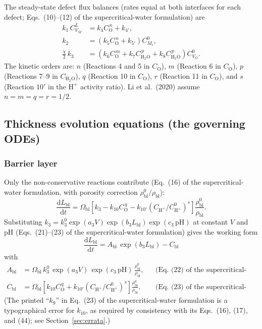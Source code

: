 The steady-state defect flux balances (rates equal at both interfaces for each
defect; Eqs.~(10)--(12) of the supercritical-water formulation) are
\begin{align}
k_1\, C_{V_M}^{L} &= k_4 C_{\mathrm{O}}^{\,n} + k_{4'} , \\
k_2 &= \left( k_5 C_{\mathrm{O}}^{\,n} + k_{5'} \right) C_{M_i}^{0} , \\
\frac{\chi}{2}\, k_3 &= \left( k_6 C_{\mathrm{O}}^{\,m}
+ k_7 C_{\mathrm{H_2O}}^{\,p} + k_8 C_{\mathrm{H_2O}}^{\,p} \right) C_{V_O}^{0} .
\end{align}
The kinetic orders are: $n$ (Reactions 4 and 5 in $C_{\mathrm{O}}$),
$m$ (Reaction 6 in $C_{\mathrm{O}}$), $p$ (Reactions 7--9 in
$C_{\mathrm{H_2O}}$), $q$ (Reaction 10 in $C_{\mathrm{O}}$),
$r$ (Reaction 11 in $C_{\mathrm{O}}$), and $s$ (Reaction $10'$ in the
$\mathrm{H^+}$ activity ratio). Li et al.\ (2020) assume $n = m = q = r = 1/2$.

\subsection{Thickness evolution equations (the governing ODEs)}
\label{sec:odes}

\subsubsection{Barrier layer}

Only the non-conservative reactions contribute
(Eq.~(16) of the supercritical-water formulation, with porosity correction
$\rho^0_{\mathrm{bl}}/\rho_{\mathrm{bl}}$):
\begin{equation}
\frac{\mathrm{d}L_{\mathrm{bl}}}{\mathrm{d}t}
= \Omega_{\mathrm{bl}} \left[ k_3 - k_{10} C_{\mathrm{O}}^{\,q}
- k_{10'} \left( C_{\mathrm{H^+}}/C^0_{\mathrm{H^+}} \right)^{s} \right]
\frac{\rho^0_{\mathrm{bl}}}{\rho_{\mathrm{bl}}} .
\end{equation}
Substituting
$k_3 = k_3^{0} \exp(a_3 V) \exp(b_3 L_{\mathrm{bl}}) \exp(c_3\,\mathrm{pH})$
at constant $V$ and pH (Eqs.~(21)--(23) of the supercritical-water
formulation) gives the working form
\begin{equation}
\boxed{\;
\frac{\mathrm{d}L_{\mathrm{bl}}}{\mathrm{d}t}
= A_{\mathrm{bl}}\, \exp( b_3 L_{\mathrm{bl}} ) - C_{\mathrm{bl}}
\;}
\label{eq:blode}
\end{equation}
with
\begin{align}
A_{\mathrm{bl}} &= \Omega_{\mathrm{bl}}\, k_3^{0}\, \exp(a_3 V)\,
\exp(c_3\,\mathrm{pH})\, \frac{\rho^0_{\mathrm{bl}}}{\rho_{\mathrm{bl}}} ,
&&\text{(Eq.~(22) of the supercritical-water formulation)}
\label{eq:Abl} \\
C_{\mathrm{bl}} &= \Omega_{\mathrm{bl}} \left[ k_{10} C_{\mathrm{O}}^{\,q}
+ k_{10'} \left( C_{\mathrm{H^+}}/C^0_{\mathrm{H^+}} \right)^{s} \right]
\frac{\rho^0_{\mathrm{bl}}}{\rho_{\mathrm{bl}}} .
&&\text{(Eq.~(23) of the supercritical-water formulation)}
\label{eq:Cbl}
\end{align}
(The printed ``$k_9$'' in Eq.~(23) of the supercritical-water formulation is a
typographical error for $k_{10}$, as required by consistency with its
Eqs.~(16), (17), and (44); see Section~\ref{sec:errata}.)

